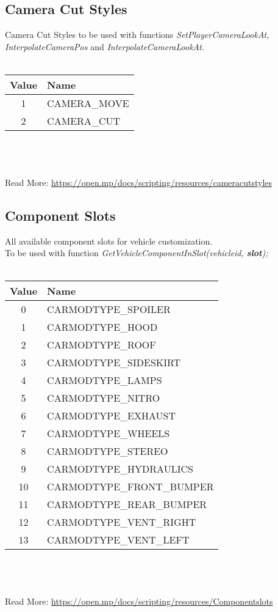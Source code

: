 \documentclass{article}
\begin{document}
\subsection{Camera Cut Styles}
Camera Cut Styles to be used with functions \textit{SetPlayerCameraLookAt}, \textit{InterpolateCameraPos} and \textit{InterpolateCameraLookAt}.
\\
\\
\begin{tabular}{ |c|l| } 
\hline
Value & Name \\
\hline
1 & CAMERA\_MOVE \\ 
2 & CAMERA\_CUT \\ 
\hline
\end{tabular}
\\\\
\\Read More: \url{https://open.mp/docs/scripting/resources/cameracutstyles}


\subsection{Component Slots}
All available component slots for vehicle customization.\\To be used with function \textit{GetVehicleComponentInSlot(vehicleid, \textbf{slot});}
\\
\\
\begin{tabular}{ |c|l| } 
\hline
Value & Name \\
\hline
0 & CARMODTYPE\_SPOILER \\
1 & CARMODTYPE\_HOOD \\
2 & CARMODTYPE\_ROOF \\
3 & CARMODTYPE\_SIDESKIRT \\
4 & CARMODTYPE\_LAMPS \\
5 & CARMODTYPE\_NITRO \\
6 & CARMODTYPE\_EXHAUST \\
7 & CARMODTYPE\_WHEELS \\
8 & CARMODTYPE\_STEREO \\
9 & CARMODTYPE\_HYDRAULICS \\
10 & CARMODTYPE\_FRONT\_BUMPER \\
11 & CARMODTYPE\_REAR\_BUMPER \\
12 & CARMODTYPE\_VENT\_RIGHT \\
13 & CARMODTYPE\_VENT\_LEFT \\
\hline
\end{tabular}
\\\\
\\Read More: \url{https://open.mp/docs/scripting/resources/Componentslots}
\end{document}
